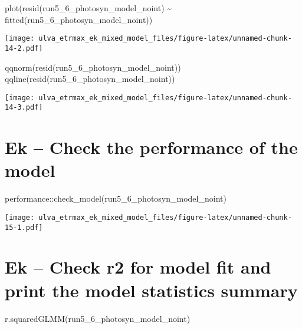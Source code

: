 \documentclass[
]{article}
\newenvironment{Shaded}{\begin{snugshade}}{\end{snugshade}}
\newcommand{\FunctionTok}[1]{\textcolor[rgb]{0.00,0.00,0.00}{#1}}
\newcommand{\NormalTok}[1]{#1}
\newcommand{\SpecialCharTok}[1]{\textcolor[rgb]{0.00,0.00,0.00}{#1}}
\begin{document}
\begin{Shaded}
\begin{Highlighting}[]
\FunctionTok{plot}\NormalTok{(}\FunctionTok{resid}\NormalTok{(run5\_6\_photosyn\_model\_noint) }\SpecialCharTok{\textasciitilde{}} \FunctionTok{fitted}\NormalTok{(run5\_6\_photosyn\_model\_noint))}
\end{Highlighting}
\end{Shaded}

\texttt{[image: ulva\_etrmax\_ek\_mixed\_model\_files/figure-latex/unnamed-chunk-14-2.pdf]}

\begin{Shaded}
\begin{Highlighting}[]
\FunctionTok{qqnorm}\NormalTok{(}\FunctionTok{resid}\NormalTok{(run5\_6\_photosyn\_model\_noint))}
\FunctionTok{qqline}\NormalTok{(}\FunctionTok{resid}\NormalTok{(run5\_6\_photosyn\_model\_noint))}
\end{Highlighting}
\end{Shaded}

\texttt{[image: ulva\_etrmax\_ek\_mixed\_model\_files/figure-latex/unnamed-chunk-14-3.pdf]}

\hypertarget{ek-check-the-performance-of-the-model}{%
\section{Ek -- Check the performance of the
model}\label{ek-check-the-performance-of-the-model}}

\begin{Shaded}
\begin{Highlighting}[]
\NormalTok{performance}\SpecialCharTok{::}\FunctionTok{check\_model}\NormalTok{(run5\_6\_photosyn\_model\_noint)}
\end{Highlighting}
\end{Shaded}

\texttt{[image: ulva\_etrmax\_ek\_mixed\_model\_files/figure-latex/unnamed-chunk-15-1.pdf]}

\hypertarget{ek-check-r2-for-model-fit-and-print-the-model-statistics-summary}{%
\section{Ek -- Check r2 for model fit and print the model statistics
summary}\label{ek-check-r2-for-model-fit-and-print-the-model-statistics-summary}}

\begin{Shaded}
\begin{Highlighting}[]
\FunctionTok{r.squaredGLMM}\NormalTok{(run5\_6\_photosyn\_model\_noint)}
\end{Highlighting}
\end{Shaded}
\end{document}
